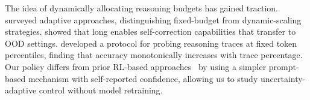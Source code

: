 The idea of dynamically allocating reasoning budgets has gained traction. \citet{zhang2025reasoningbudget} surveyed adaptive approaches, distinguishing fixed-budget from dynamic-scaling strategies. \citet{chen2025demystifying} showed that long \CoT enables self-correction capabilities that transfer to OOD settings. \citet{ballon2026trajectories} developed a protocol for probing reasoning traces at fixed token percentiles, finding that accuracy monotonically increases with trace percentage. Our \padaptive policy differs from prior RL-based approaches~\citep{aggarwal2025l1} by using a simpler prompt-based mechanism with self-reported confidence, allowing us to study uncertainty-adaptive control without model retraining.
